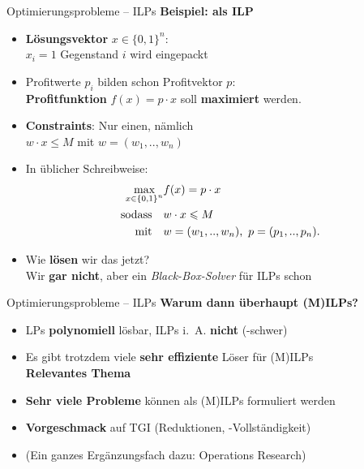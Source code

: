 \begin{frame}{Optimierungsprobleme – ILPs}
	\textbf{Beispiel: \Knapsack als ILP} 
	\begin{itemize} 
		\item \textbf{Lösungsvektor} $x \in \{0, 1\}^n$: \\ 
		\quad  $x_i = 1$ \gdw Gegenstand $i$ wird eingepackt
		\pause 
		\item Profitwerte $p_i$ bilden schon Profitvektor $p$: \\ \impl \textbf{Profitfunktion} $f(x) = p \cdot x$ soll \textbf{maximiert} werden.
		\pause
		\item \textbf{Constraints}: Nur einen, nämlich \\
		 \quad $w \cdot x \leq M$ \quad mit $w = (w_1,..,w_n)$
		\pause
		\item In üblicher Schreibweise: 
		\begin{align*}
			\max_{x \in \left\{0,1\right\}^n} &f(x) = p \cdot x \\
			 \text{sodass} \quad & w \cdot x \leqslant M \\
			\text{mit} \quad & \text{$w = (w_1,..,w_n)$,\, $p = (p_1,..,p_n)$.} 
		\end{align*} \vspace{-1.2\baselineskip}
		\pause
		\item Wie \textbf{lösen} wir das jetzt? \\
		\impl Wir \textbf{gar nicht}, aber ein \textit{Black-Box-Solver} für ILPs schon \smiley
	\end{itemize}
\end{frame}


\begin{frame}{Optimierungsprobleme – ILPs}
	\textbf{Warum dann überhaupt (M)ILPs?} 
	\begin{itemize}
		\item LPs \textbf{polynomiell} lösbar, ILPs i.~A. \textbf{nicht} (\NP-schwer)
		\item Es gibt trotzdem viele \textbf{sehr effiziente} Löser für (M)ILPs \\
		\impl \textbf{Relevantes Thema}
		\pause
		\item \textbf{Sehr viele Probleme} können als (M)ILPs formuliert werden
		\pause
		\item \textbf{Vorgeschmack} auf TGI (Reduktionen, \NP-Vollständigkeit)
		\item {\small (Ein ganzes Ergänzungsfach dazu: Operations Research)}
	\end{itemize}
\end{frame}


